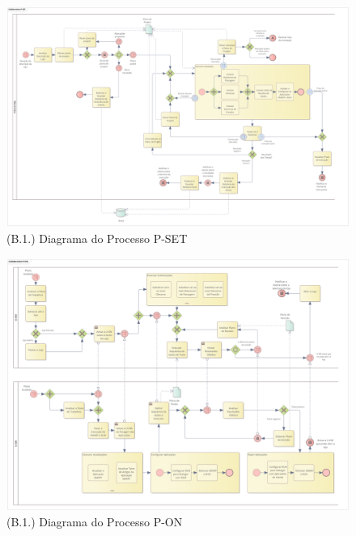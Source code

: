 \documentclass[12pt,a4paper]{article}
\begin{document}
\begin{landscape}
  \begin{figure}
    \centering
    \includegraphics[width=1.5\textwidth]{assets/ea-p_set.png}
    \caption{(B.1.) Diagrama do Processo P-SET}
    \label{fig:p-set-bpmn}
  \end{figure}
\end{landscape}

\begin{landscape}
  \begin{figure}
    \centering
    \includegraphics[width=1.35\textwidth]{assets/ea-p_on.png}
    \caption{(B.1.) Diagrama do Processo P-ON}
    \label{fig:p-on-bpmn}
  \end{figure}
\end{landscape}
\end{document}
